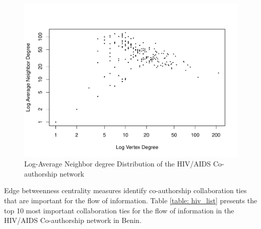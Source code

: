 \begin{figure}[h!]
\centering
\includegraphics[scale=0.65]{Chapters/hiv/logAvgDegree}
\caption{Log-Average Neighbor degree Distribution of the HIV/AIDS Co-authorship network}
\label{hiv_fig2}
\end{figure}

Edge betweenness centrality measures identify co-authorship collaboration ties that are important for the flow of information. Table \ref{table: hiv_list} presents the top 10 most important collaboration ties for the flow of information in the HIV/AIDS Co-authorship network in Benin.

